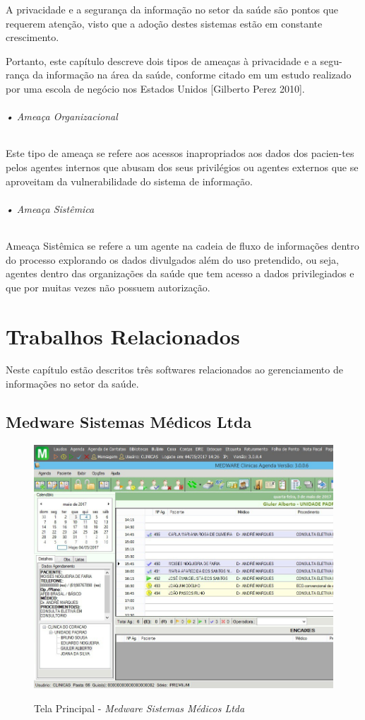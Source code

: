 \documentclass[portuguese,oneside]{tcc}
\begin{document}
A privacidade e a segurança da informação no setor da saúde são pontos que requerem atenção, visto que a adoção destes sistemas estão em constante crescimento.

Portanto, este capítulo descreve dois tipos de ameaças à privacidade e a segu-rança da informação na área da saúde, conforme citado em um estudo realizado por uma escola de negócio nos Estados Unidos [Gilberto Perez 2010].


\subparagraph{• Ameaça Organizacional}
Este tipo de ameaça se refere aos acessos inapropriados aos dados dos pacien-tes pelos agentes internos que abusam dos seus privilégios ou agentes externos que se aproveitam da vulnerabilidade do sistema de informação.


\subparagraph{• Ameaça Sistêmica}
Ameaça Sistêmica se refere a um agente na cadeia de fluxo de informações dentro do processo explorando os dados divulgados além do uso pretendido, ou seja, agentes dentro das organizações da saúde que tem acesso a dados privilegiados e que por muitas vezes não possuem autorização.

\chapter{Trabalhos Relacionados}
\label{tab:trabalhos-relacionados}	
Neste capítulo estão descritos três softwares relacionados ao gerenciamento de informações no setor da saúde.

\section{Medware Sistemas Médicos Ltda}

\begin{figure}[htp]
\centering
\caption{Tela Principal - \textit{Medware Sistemas Médicos Ltda}}
\includegraphics[width=12cm]{medware}
\label{fig:CalDoseX}
\end{figure}
\end{document}
